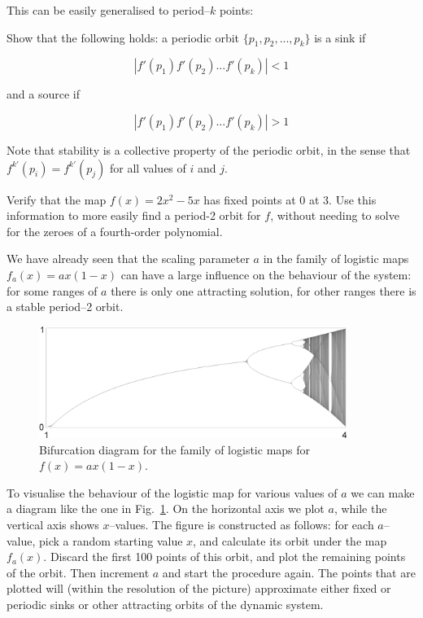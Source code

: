 This can be easily generalised to period--$k$ points:

\begin{exer}
Show that the following holds: a periodic orbit $\{p_1, p_2, ..., p_k\}$ is a sink if

$$|f'(p_1) f'(p_2) ... f'(p_k)| < 1$$

and a source if

$$|f'(p_1) f'(p_2) ... f'(p_k)| > 1$$

\end{exer}


Note that stability is a collective property of the periodic orbit, in the sense that $f^{k'}(p_i) = f^{k'}(p_j)$ for all values of $i$ and $j$.


\begin{exer}
Verify that the map $f(x)=2x^2-5x$ has fixed points at 0 at 3. Use this information to more easily find a period-2 orbit for $f$, without needing to solve for the zeroes of a fourth-order polynomial.
\end{exer}


\pagebreak


We have already seen that the scaling parameter $a$ in the family of logistic maps $f_a(x)=ax(1-x)$ can have a large influence on the behaviour of the system: for some ranges of $a$ there is only one attracting solution, for other ranges there is a stable period--2 orbit.

\begin{figure}
\centering
\includegraphics[width=10cm]{dynamic/figures/bifurcation}
\caption{Bifurcation diagram for the family of logistic maps for $f(x)=ax(1-x)$.}
\label{fig-bifur}
\end{figure} 

\noindent{}To visualise the behaviour of the logistic map for various values of $a$ we can make a diagram like the one in Fig.~\ref{fig-bifur}. On the horizontal axis we plot $a$, while the vertical axis shows $x$--values. The figure is constructed as follows: for each $a$--value, pick a random starting value $x$, and calculate its orbit under the map $f_a(x)$. Discard the first 100 points of this orbit, and plot the remaining points of the orbit. Then increment $a$ and start the procedure again. The points that are plotted will (within the resolution of the picture) approximate either fixed or periodic sinks or other attracting orbits of the dynamic system.

